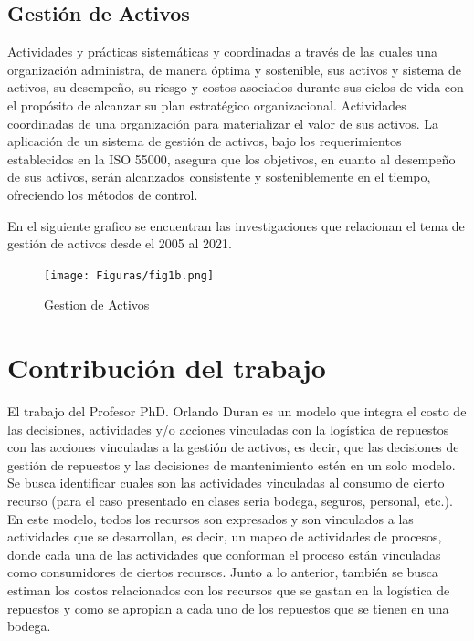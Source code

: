 \documentclass[]{article}
\begin{document}
\subsection{Gestión de Activos}


Actividades y prácticas sistemáticas y coordinadas a través de las cuales una organización administra, de manera óptima y sostenible, sus activos y sistema de activos, su desempeño, su riesgo y costos asociados durante sus ciclos de vida con el propósito de alcanzar su plan estratégico organizacional. Actividades coordinadas de una organización para materializar el valor de sus activos.
La aplicación de un sistema de gestión de activos, bajo los requerimientos establecidos en la ISO 55000, asegura que los objetivos, en cuanto al desempeño de sus activos, serán alcanzados consistente y sosteniblemente en el tiempo, ofreciendo los métodos de control.\cite{amendola2003indicadores}

En el siguiente grafico se encuentran las investigaciones que relacionan el tema de gestión de activos desde el 2005 al 2021.

\begin{figure}[!h]
    \centering
    \texttt{[image: Figuras/fig1b.png]}
    \caption{Gestion de Activos}
    \label{fig:my_label}
\end{figure}

\hypertarget{contribucion-del-trabajo-identificacion-del-aporte-que-se-hace}{%
\section{Contribución del trabajo}
\label{contribucion-del-trabajo-identificacion-del-aporte-que-se-hace}}
El trabajo del Profesor PhD. Orlando Duran es un modelo que integra el costo de las decisiones, actividades y/o acciones vinculadas con la logística de repuestos con las acciones vinculadas a la gestión de activos, es decir, que las decisiones de gestión de repuestos y las decisiones de mantenimiento estén en un solo modelo.
Se busca identificar cuales son las actividades vinculadas al consumo de cierto recurso (para el caso presentado en clases seria bodega, seguros, personal, etc.). En este modelo, todos los recursos son expresados y son vinculados a las actividades que se desarrollan, es decir, un mapeo de actividades de procesos, donde cada una de las actividades que conforman el proceso están vinculadas como consumidores de ciertos recursos.
Junto a lo anterior, también se busca estiman los costos relacionados con los recursos que se gastan en la logística de repuestos y como se apropian a cada uno de los repuestos que se tienen en una bodega. 
\end{document}

